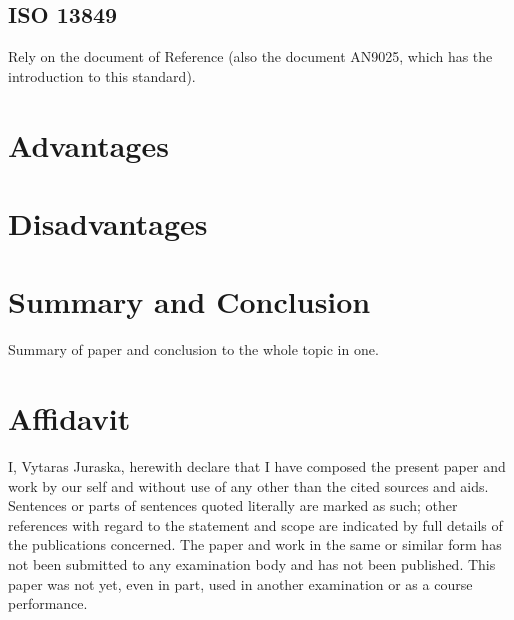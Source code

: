 \documentclass[conference]{IEEEtran}
\begin{document}
\subsection{ISO 13849}

Rely on the document of Reference \cite{meany_functional_2017} (also the document AN9025, which has the introduction to this standard).

\section{Advantages}

\section{Disadvantages}

\section{Summary and Conclusion}

    Summary of paper and conclusion to the whole topic in one.

\section{Affidavit}
I, Vytaras Juraska, herewith declare that I have composed the present paper and work by our self and without use of any other than the cited sources and aids. Sentences or parts of sentences quoted literally are marked as such; other references with regard to the statement and scope are indicated by full details of the publications concerned. The paper and work in the same or similar form has not been submitted to any examination body and has not been published. This paper was not yet, even in part, used in another examination or as a course performance.


\end{document}
